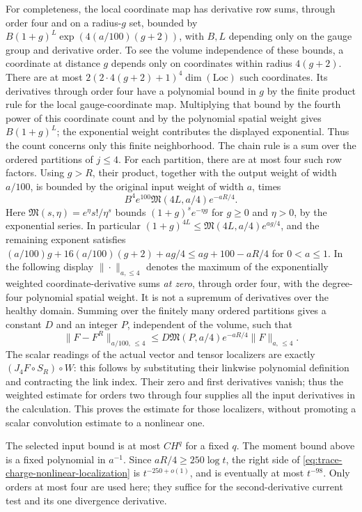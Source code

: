 For completeness, the local coordinate map has derivative row sums,
through order four and on a radius-$g$ set, bounded by
$B(1+g)^L\exp(4(a/100)(g+2))$, with $B,L$ depending only on the gauge
group and derivative order. To see the volume independence of these bounds, a coordinate at distance
$g$ depends only on coordinates within radius $4(g+2)$. There are at most
$2(2\cdot4(g+2)+1)^4\dim(\mathrm{Loc})$ such coordinates. Its derivatives
through order four have a polynomial bound in $g$ by the finite product
rule for the local gauge-coordinate map. Multiplying that bound by the
fourth power of this coordinate count and by the polynomial spatial
weight gives $B(1+g)^L$; the exponential weight contributes the displayed
exponential. Thus the count concerns only this finite neighborhood. The chain rule is a sum over the
ordered partitions of $j\le4$. For each partition, there are at most
four such row factors. Using $g>R$, their product, together with the
output weight of width $a/100$, is bounded by the original input weight
of width $a$, times
\[
 B^4 e^{100}\mathfrak M(4L,a/4)e^{-aR/4}.
\]
Here $\mathfrak M(s,\eta)=e^\eta s!/\eta^s$ bounds
$(1+g)^s e^{-\eta g}$ for $g\ge0$ and $\eta>0$, by the exponential
series. In particular $(1+g)^{4L}\le\mathfrak M(4L,a/4)e^{ag/4}$,
and the remaining exponent satisfies
$(a/100)g+16(a/100)(g+2)+ag/4
 \le ag+100-aR/4$ for $0<a\le1$.
In the following display $\|\cdot\|_{a,\le4}$ denotes the maximum of
the exponentially weighted coordinate-derivative sums \emph{at zero},
through order four, with the degree-four polynomial spatial weight.
It is not a supremum of derivatives over the healthy domain.
Summing over the finitely many ordered partitions gives a constant $D$
and an integer $P$, independent of the volume, such that
\begin{equation}
 \|F-F^R\|_{a/100,\,\le4}
 \le D\mathfrak M(P,a/4)e^{-aR/4}
          \|F\|_{a,\,\le4}.
 \label{eq:trace-charge-nonlinear-localization}
\end{equation}
The scalar readings of the actual vector and tensor localizers are
exactly $(J_4F\circ S_R)\circ W$: this follows by substituting their
linkwise polynomial definition and contracting the link index. Their
zero and first derivatives vanish; thus the weighted estimate for
orders two through four supplies all the input derivatives in the
calculation. This proves the estimate for those localizers, without
promoting a scalar convolution estimate to a nonlinear one.

The selected input bound is at most $C H^q$ for a fixed $q$.
The moment bound above is a fixed polynomial in $a^{-1}$.
Since $aR/4\ge250\log t$, the right side of
\eqref{eq:trace-charge-nonlinear-localization} is $t^{-250+o(1)}$,
and is eventually at most $t^{-98}$. Only orders at most four are used
here; they suffice for the second-derivative current test and its one
divergence derivative.

